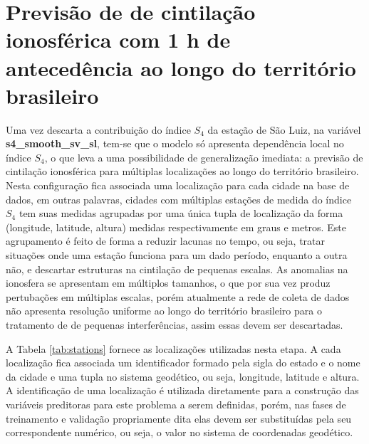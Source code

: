
\section{Previsão de de cintilação ionosférica com 1 h de antecedência ao longo do território brasileiro}

Uma vez descarta a contribuição do índice $S_4$ da estação de São Luiz, na variável {\bf s4\_smooth\_sv\_sl}, tem-se que o modelo só apresenta dependência local no índice $S_4$, o que leva a uma possibilidade de generalização imediata: a previsão de cintilação ionosférica para múltiplas localizações ao longo do território brasileiro. Nesta configuração fica associada uma localização para cada cidade na base de dados, em outras palavras, cidades com múltiplas estações de medida do índice $S_4$ tem suas medidas agrupadas por uma única tupla de localização da forma (longitude, latitude, altura) medidas respectivamente em graus e metros. Este agrupamento é feito de forma a reduzir lacunas no tempo, ou seja, tratar situações onde uma estação funciona para um dado período, enquanto a outra não, e descartar estruturas na cintilação de pequenas escalas. As anomalias na ionosfera se apresentam em múltiplos tamanhos, o que por sua vez produz pertubações em múltiplas escalas, porém atualmente a rede de coleta de dados não apresenta resolução uniforme ao longo do território brasileiro para o tratamento de de pequenas interferências, assim essas devem ser descartadas.

A Tabela \ref{tab:stations} fornece as localizações utilizadas nesta etapa. A cada localização fica associada um identificador formado pela sigla do estado e o nome da cidade e uma tupla no sistema geodético, ou seja, longitude, latitude e altura. A identificação de uma localização é utilizada diretamente para a construção das variáveis preditoras para este problema a serem definidas, porém, nas fases de treinamento e validação propriamente dita elas devem ser substituídas pela seu correspondente numérico, ou seja, o valor no sistema de coordenadas geodético.

